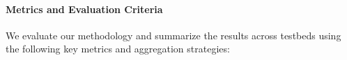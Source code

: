 \documentclass[sigplan,10pt]{acmart}
\newcommand{\ourmethod}{\textsc{BenchScout}\xspace}
\newcommand{\appname}{BenchScout}
\begin{document}


\paragraph{Metrics and Evaluation Criteria}
\label{subsubsec:metrics}
We evaluate our methodology and summarize the results across testbeds using the following key metrics and aggregation strategies:
\end{document}

